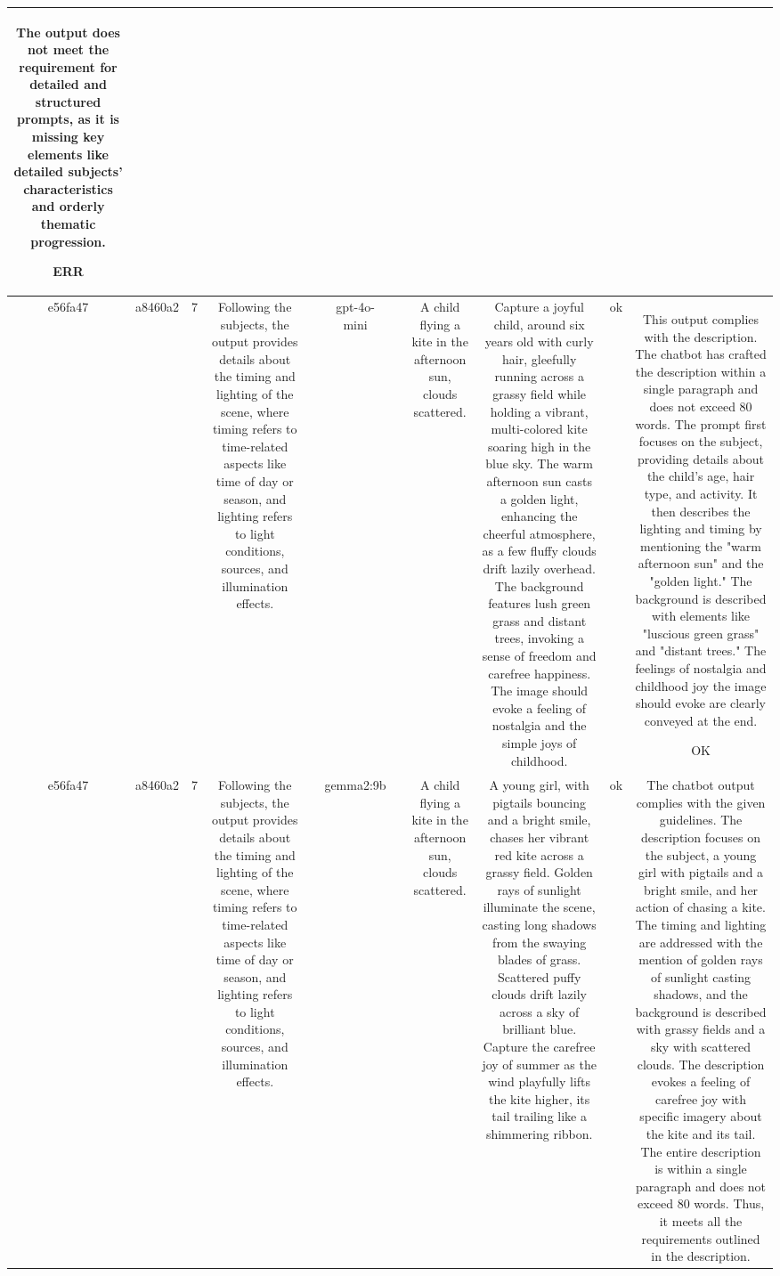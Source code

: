 \begin{table}[h!]
\begin{tabular}{|c|c|c|c|c|c|c|c|c|c|c|}
The output does not meet the requirement for detailed and structured prompts, as it is missing key elements like detailed subjects' characteristics and orderly thematic progression.

ERR\\
\hline
e56fa47 & a8460a2 & 7 & Following the subjects, the output provides details about the timing and lighting of the scene, where timing refers to time-related aspects like time of day or season, and lighting refers to light conditions, sources, and illumination effects. &  & gpt-4o-mini &  & A child flying a kite in the afternoon sun, clouds scattered. & Capture a joyful child, around six years old with curly hair, gleefully running across a grassy field while holding a vibrant, multi-colored kite soaring high in the blue sky. The warm afternoon sun casts a golden light, enhancing the cheerful atmosphere, as a few fluffy clouds drift lazily overhead. The background features lush green grass and distant trees, invoking a sense of freedom and carefree happiness. The image should evoke a feeling of nostalgia and the simple joys of childhood. & ok & This output complies with the description. The chatbot has crafted the description within a single paragraph and does not exceed 80 words. The prompt first focuses on the subject, providing details about the child's age, hair type, and activity. It then describes the lighting and timing by mentioning the "warm afternoon sun" and the "golden light." The background is described with elements like "luscious green grass" and "distant trees." The feelings of nostalgia and childhood joy the image should evoke are clearly conveyed at the end. 

OK\\
\hline
e56fa47 & a8460a2 & 7 & Following the subjects, the output provides details about the timing and lighting of the scene, where timing refers to time-related aspects like time of day or season, and lighting refers to light conditions, sources, and illumination effects. &  & gemma2:9b &  & A child flying a kite in the afternoon sun, clouds scattered. & A young girl, with pigtails bouncing and a bright smile, chases her vibrant red kite across a grassy field. Golden rays of sunlight illuminate the scene, casting long shadows from the swaying blades of grass. Scattered puffy clouds drift lazily across a sky of brilliant blue. Capture the carefree joy of summer as the wind playfully lifts the kite higher, its tail trailing like a shimmering ribbon.   
 & ok & The chatbot output complies with the given guidelines. The description focuses on the subject, a young girl with pigtails and a bright smile, and her action of chasing a kite. The timing and lighting are addressed with the mention of golden rays of sunlight casting shadows, and the background is described with grassy fields and a sky with scattered clouds. The description evokes a feeling of carefree joy with specific imagery about the kite and its tail. The entire description is within a single paragraph and does not exceed 80 words. Thus, it meets all the requirements outlined in the description.


\end{tabular}
\end{table}
